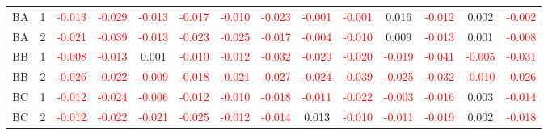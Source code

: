 \begin{table}[H]
{\begin{tabular}{llcccccccccccc}
BA & 1 & \textcolor{red}{-0.013} & \textcolor{red}{-0.029} & \textcolor{red}{-0.013} & \textcolor{red}{-0.017} & \textcolor{red}{-0.010} & \textcolor{red}{-0.023} & \textcolor{red}{-0.001} & \textcolor{red}{-0.001} & 0.016 & \textcolor{red}{-0.012} & 0.002 & \textcolor{red}{-0.002}\\
BA & 2 & \textcolor{red}{-0.021} & \textcolor{red}{-0.039} & \textcolor{red}{-0.013} & \textcolor{red}{-0.023} & \textcolor{red}{-0.025} & \textcolor{red}{-0.017} & \textcolor{red}{-0.004} & \textcolor{red}{-0.010} & 0.009 & \textcolor{red}{-0.013} & 0.001 & \textcolor{red}{-0.008}\\
BB & 1 & \textcolor{red}{-0.008} & \textcolor{red}{-0.013} & 0.001 & \textcolor{red}{-0.010} & \textcolor{red}{-0.012} & \textcolor{red}{-0.032} & \textcolor{red}{-0.020} & \textcolor{red}{-0.020} & \textcolor{red}{-0.019} & \textcolor{red}{-0.041} & \textcolor{red}{-0.005} & \textcolor{red}{-0.031}\\
BB & 2 & \textcolor{red}{-0.026} & \textcolor{red}{-0.022} & \textcolor{red}{-0.009} & \textcolor{red}{-0.018} & \textcolor{red}{-0.021} & \textcolor{red}{-0.027} & \textcolor{red}{-0.024} & \textcolor{red}{-0.039} & \textcolor{red}{-0.025} & \textcolor{red}{-0.032} & \textcolor{red}{-0.010} & \textcolor{red}{-0.026}\\
BC & 1 & \textcolor{red}{-0.012} & \textcolor{red}{-0.024} & \textcolor{red}{-0.006} & \textcolor{red}{-0.012} & \textcolor{red}{-0.010} & \textcolor{red}{-0.018} & \textcolor{red}{-0.011} & \textcolor{red}{-0.022} & \textcolor{red}{-0.003} & \textcolor{red}{-0.016} & 0.003 & \textcolor{red}{-0.014}\\
BC & 2 & \textcolor{red}{-0.012} & \textcolor{red}{-0.022} & \textcolor{red}{-0.021} & \textcolor{red}{-0.025} & \textcolor{red}{-0.012} & \textcolor{red}{-0.014} & 0.013 & \textcolor{red}{-0.010} & \textcolor{red}{-0.011} & \textcolor{red}{-0.019} & 0.002 & \textcolor{red}{-0.018}\\
\hline

    \end{tabular}%
    }
    \label{tab:cen1_cov}
\end{table}

